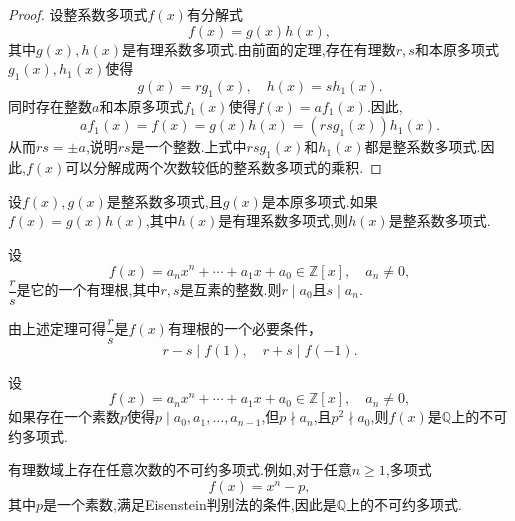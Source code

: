 \begin{proof}
    设整系数多项式$f(x)$有分解式
    \begin{equation*}
        f(x)=g(x)h(x),
    \end{equation*}
    其中$g(x),h(x)$是有理系数多项式.由前面的定理,存在有理数$r,s$和本原多项式$g_1(x),h_1(x)$使得
    \begin{equation*}        
        g(x)=rg_1(x),\quad h(x)=sh_1(x).
    \end{equation*}
    同时存在整数$a$和本原多项式$f_1(x)$使得$f(x)=af_1(x)$.因此,
    \begin{equation*}
        af_1(x)=f(x)=g(x)h(x)=(rsg_1(x))h_1(x).
    \end{equation*}
    从而$rs=\pm a$,说明$rs$是一个整数.上式中$rsg_1(x)$和$h_1(x)$都是整系数多项式.因此,$f(x)$可以分解成两个次数较低的整系数多项式的乘积.
\end{proof}
\begin{theorem}
    设$f(x),g(x)$是整系数多项式,且$g(x)$是本原多项式.如果$f(x)=g(x)h(x)$,其中$h(x)$是有理系数多项式,则$h(x)$是整系数多项式.
\end{theorem}
\begin{theorem}
    设\begin{equation*}
        f(x)=a_nx^n+\cdots+a_1x+a_0\in\mathbb{Z}[x],\quad a_n\neq 0,
    \end{equation*}
    $\dfrac{r}{s}$是它的一个有理根,其中$r,s$是互素的整数.则$r\mid a_0$且$s\mid a_n$.
\end{theorem}
由上述定理可得$\dfrac{r}{s}$是$f(x)$有理根的一个必要条件，
\begin{equation*}
    r-s\mid f(1),\quad r+s\mid f(-1).
\end{equation*}
\begin{theorem}[Eisenstein判别法]
    设\begin{equation*}
        f(x)=a_nx^n+\cdots+a_1x+a_0\in\mathbb{Z}[x],\quad a_n\neq 0,
    \end{equation*}
    如果存在一个素数$p$使得$p\mid a_0,a_1,\ldots,a_{n-1}$,但$p\nmid a_n$,且$p^2\nmid a_0$,则$f(x)$是$\mathbb{Q}$上的不可约多项式.
\end{theorem}
有理数域上存在任意次数的不可约多项式.例如,对于任意$n\geq 1$,多项式
\begin{equation*}
    f(x)=x^n-p, 
\end{equation*}其中$p$是一个素数,满足Eisenstein判别法的条件,因此是$\mathbb{Q}$上的不可约多项式.
